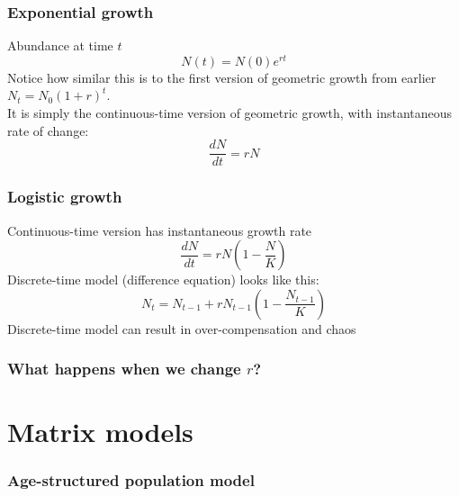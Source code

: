 \documentclass[color=usenames,dvipsnames]{beamer}\usepackage[]{graphicx}\usepackage[]{color}
\begin{document}
\begin{frame}
  \frametitle{Exponential growth}
  Abundance at time $t$
  \[
    N(t) = N(0)e^{rt}
  \]
  \pause
  Notice how similar this is to the first version of geometric growth
  from earlier $N_t = N_0(1+r)^t$. \\
  \pause
  \vfill
  It is simply the continuous-time version of geometric growth, with
  instantaneous rate of change:
  \[
    \frac{dN}{dt} = rN
  \]
\end{frame}








\begin{frame}
  \frametitle{Logistic growth}
  Continuous-time version has instantaneous growth rate
  \[
    \frac{dN}{dt} = rN\left(1-\frac{N}{K}\right)
  \]
  \pause
  \vfill
  Discrete-time model (difference equation) looks like this:
  \[
    N_t = N_{t-1} + rN_{t-1}\left(1-\frac{N_{t-1}}{K}\right)
  \]
  \pause
  \vfill
  Discrete-time model can result in over-compensation and chaos
\end{frame}




\begin{frame}[fragile]
  \frametitle{What happens when we change $r$?}





\begin{center}
\end{center}
\end{frame}





\section{Matrix models}

\begin{frame}
  \frametitle{Age-structured population model}

\end{frame}
\end{document}
